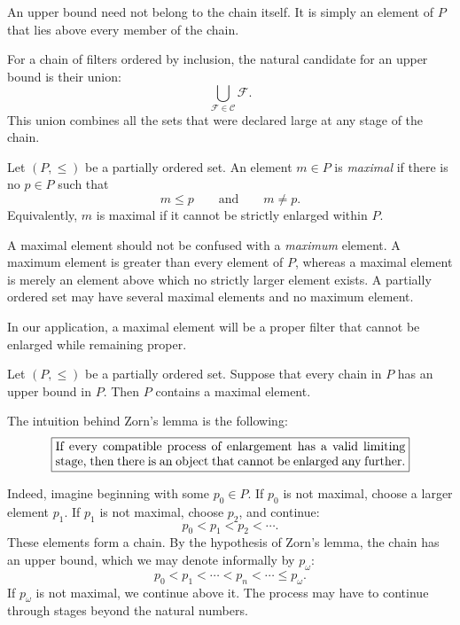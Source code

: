 {An upper bound need not belong to the chain itself. It is simply an element
of \(P\) that lies above every member of the chain.

For a chain of filters ordered by inclusion, the natural candidate for an
upper bound is their union:
\[
\bigcup_{\mathcal{F}\in\mathcal{C}}\mathcal{F}.
\]
This union combines all the sets that were declared large at any stage of
the chain.

\begin{defn}
Let \((P,\leq)\) be a partially ordered set. An element \(m\in P\) is
\emph{maximal} if there is no \(p\in P\) such that
\[
m\leq p
\qquad\text{and}\qquad
m\neq p.
\]
Equivalently, \(m\) is maximal if it cannot be strictly enlarged within
\(P\).
\end{defn}

A maximal element should not be confused with a \emph{maximum} element. A
maximum element is greater than every element of \(P\), whereas a maximal
element is merely an element above which no strictly larger element exists.
A partially ordered set may have several maximal elements and no maximum
element.

In our application, a maximal element will be a proper filter that cannot
be enlarged while remaining proper.

\begin{prop}
\label{prop:zorns-lemma}
Let \((P,\leq)\) be a partially ordered set. Suppose that every chain in
\(P\) has an upper bound in \(P\). Then \(P\) contains a maximal element.
\end{prop}

The intuition behind Zorn's lemma is the following:
\[
\boxed{
\begin{minipage}{0.82\textwidth}
If every compatible process of enlargement has a valid limiting stage,
then there is an object that cannot be enlarged any further.
\end{minipage}
}
\]

Indeed, imagine beginning with some \(p_0\in P\). If \(p_0\) is not
maximal, choose a larger element \(p_1\). If \(p_1\) is not maximal, choose
\(p_2\), and continue:
\[
p_0<p_1<p_2<\cdots.
\]
These elements form a chain. By the hypothesis of Zorn's lemma, the chain
has an upper bound, which we may denote informally by \(p_\omega\):
\[
p_0<p_1<\cdots<p_n<\cdots\leq p_\omega.
\]
If \(p_\omega\) is not maximal, we continue above it. The process may have
to continue through stages beyond the natural numbers.

}
